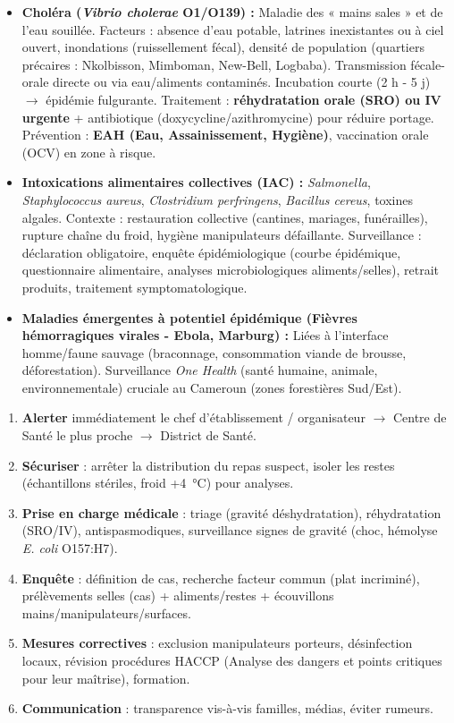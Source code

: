 \documentclass[11pt]{article}
\begin{document}
\begin{itemize}
    \item \textbf{Choléra (\emph{Vibrio cholerae} O1/O139) :} Maladie des « mains sales » et de l'eau souillée. Facteurs : absence d'eau potable, latrines inexistantes ou à ciel ouvert, inondations (ruissellement fécal), densité de population (quartiers précaires : Nkolbisson, Mimboman, New-Bell, Logbaba). Transmission fécale-orale directe ou via eau/aliments contaminés. Incubation courte (2 h - 5 j) $\rightarrow$ épidémie fulgurante. Traitement : \textbf{réhydratation orale (SRO) ou IV urgente} + antibiotique (doxycycline/azithromycine) pour réduire portage. Prévention : \textbf{EAH (Eau, Assainissement, Hygiène)}, vaccination orale (OCV) en zone à risque.
    \item \textbf{Intoxications alimentaires collectives (IAC) :} \emph{Salmonella}, \emph{Staphylococcus aureus}, \emph{Clostridium perfringens}, \emph{Bacillus cereus}, toxines algales. Contexte : restauration collective (cantines, mariages, funérailles), rupture chaîne du froid, hygiène manipulateurs défaillante. Surveillance : déclaration obligatoire, enquête épidémiologique (courbe épidémique, questionnaire alimentaire, analyses microbiologiques aliments/selles), retrait produits, traitement symptomatologique.
    \item \textbf{Maladies émergentes à potentiel épidémique (Fièvres hémorragiques virales - Ebola, Marburg) :} Liées à l'interface homme/faune sauvage (braconnage, consommation viande de brousse, déforestation). Surveillance \emph{One Health} (santé humaine, animale, environnementale) cruciale au Cameroun (zones forestières Sud/Est).
\end{itemize}

\begin{methode}
\begin{enumerate}
    \item \textbf{Alerter} immédiatement le chef d'établissement / organisateur $\rightarrow$ Centre de Santé le plus proche $\rightarrow$ District de Santé.
    \item \textbf{Sécuriser} : arrêter la distribution du repas suspect, isoler les restes (échantillons stériles, froid +\SI{4}{\celsius}) pour analyses.
    \item \textbf{Prise en charge médicale} : triage (gravité déshydratation), réhydratation (SRO/IV), antispasmodiques, surveillance signes de gravité (choc, hémolyse \emph{E. coli} O157:H7).
    \item \textbf{Enquête} : définition de cas, recherche facteur commun (plat incriminé), prélèvements selles (cas) + aliments/restes + écouvillons mains/manipulateurs/surfaces.
    \item \textbf{Mesures correctives} : exclusion manipulateurs porteurs, désinfection locaux, révision procédures HACCP (Analyse des dangers et points critiques pour leur maîtrise), formation.
    \item \textbf{Communication} : transparence vis-à-vis familles, médias, éviter rumeurs.
\end{enumerate}
\end{methode}
\end{document}
